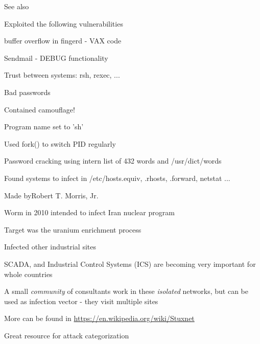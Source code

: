 \documentclass[Screen16to9,17pt]{foils}
\begin{document}
See also 


\begin{list1}
\item Exploited the following vulnerabilities
\begin{list2}
\item buffer overflow in fingerd - VAX code
\item Sendmail - DEBUG functionality
\item Trust between systems: rsh, rexec, ...
\item Bad passwords
\end{list2}
\item Contained camouflage!
\begin{list2}
\item Program name set to 'sh'
\item Used fork() to switch PID regularly
\item Password cracking using intern list of 432 words and /usr/dict/words
\item Found systems to infect in /etc/hosts.equiv, .rhosts, .forward, netstat ...
\end{list2}
\item Made byRobert T. Morris, Jr.
\end{list1}


\begin{list1}
\item Worm in 2010 intended to infect Iran nuclear program
\item Target was the uranium enrichment process
\item Infected other industrial sites
\item SCADA, and Industrial Control Systems (ICS) are becoming very important for whole countries
\item A small \emph{community} of consultants work in these \emph{isolated} networks, but can be used as infection vector - they visit multiple sites
\item More can be found in \url{https://en.wikipedia.org/wiki/Stuxnet}
\end{list1}



Great resource for attack categorization
\end{document}
